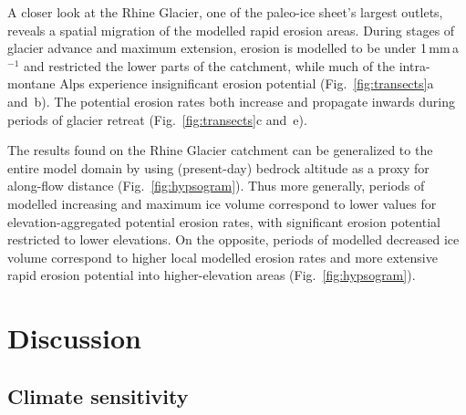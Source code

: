 \documentclass[esurf, manuscript]{copernicus}
\begin{document}
    A closer look at the Rhine Glacier, one of the paleo-ice sheet's largest
    outlets, reveals a spatial migration of the modelled rapid erosion areas.
    During stages of glacier advance and maximum extension, erosion is modelled
    to be under 1\,mm\,a$^{-1}$ and restricted the lower parts of the
    catchment, while much of the intra-montane Alps \citep[modelled to be
    largely cold-based, Fig.~6c in][]{Seguinot.etal.2018} experience
    insignificant erosion potential (Fig.~\ref{fig:transects}a and~b). The
    potential erosion rates both increase and propagate inwards during periods
    of glacier retreat (Fig.~\ref{fig:transects}c and~e).

    The results found on the Rhine Glacier catchment can be generalized to the
    entire model domain by using (present-day) bedrock altitude as a proxy for
    along-flow distance (Fig.~\ref{fig:hypsogram}). Thus more generally,
    periods of modelled increasing and maximum ice volume correspond to lower
    values for elevation-aggregated potential erosion rates, with significant
    erosion potential
    restricted to lower elevations. On the opposite, periods of modelled
    decreased ice volume correspond to higher local modelled erosion rates and
    more extensive rapid erosion potential into higher-elevation areas
    (Fig.~\ref{fig:hypsogram}).


\section{Discussion}

\subsection{Climate sensitivity}
\label{sec:sensitivity}
\end{document}
